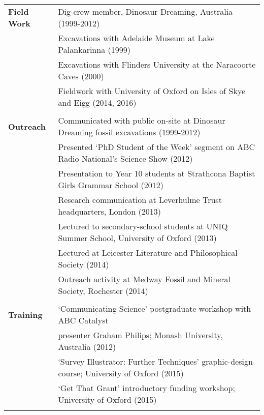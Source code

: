 \documentclass[a4paper, oneside, final]{scrartcl} %
\begin{document}
\begin{center}
\begin{flushleft}

\begin{tabular}{ @{} >{\bfseries}l @{\hspace{6ex}} l }
Field Work & Dig-crew member, Dinosaur Dreaming, Australia (1999-2012)\\
\rule{0pt}{4ex}
& Excavations with Adelaide Museum at Lake Palankarinna (1999)\\
\rule{0pt}{4ex}
& Excavations with Flinders University at the Naracoorte Caves (2000)\\
\rule{0pt}{4ex}
& Fieldwork with University of Oxford on Isles of Skye and Eigg (2014, 2016)\\
\\
Outreach & Communicated with public on-site at Dinosaur Dreaming fossil excavations (1999-2012)\\
\rule{0pt}{4ex}
& Presented `PhD Student of the Week' segment on ABC Radio National's Science Show (2012)\\
\rule{0pt}{4ex}
& Presentation to Year 10 students at Strathcona Baptist Girls Grammar School (2012)\\
\rule{0pt}{4ex}
& Research communication at Leverhulme Trust headquarters, London (2013)\\
\rule{0pt}{4ex}
& Lectured to secondary-school students at UNIQ Summer School, University of Oxford (2013)\\
\rule{0pt}{4ex}
& Lectured at Leicester Literature and Philosophical Society (2014)\\
\rule{0pt}{4ex}
& Outreach activity at Medway Fossil and Mineral Society, Rochester (2014)\\
\\
Training & `Communicating Science' postgraduate workshop with ABC Catalyst\\ 
& presenter Graham Philips; Monash University, Australia (2012)\\
\rule{0pt}{4ex}
& `Survey Illustrator: Further Techniques' graphic-design course; University of Oxford (2015)\\
\rule{0pt}{4ex}
& `Get That Grant' introductory funding workshop; University of Oxford (2015)\\
\\
\end{tabular}

\end{flushleft}



\end{center}
\end{document}

